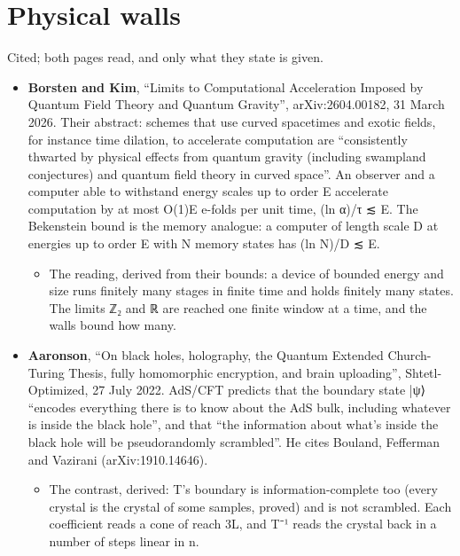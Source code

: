 \section{\texorpdfstring{Physical walls}{Physical walls}}

Cited; both pages read, and only what they state is given.

\begin{itemize}
\item \textbf{Borsten and Kim}, “Limits to Computational Acceleration Imposed by Quantum Field Theory and Quantum Gravity”, arXiv:2604.00182, 31 March 2026. Their abstract: schemes that use curved spacetimes and exotic fields, for instance time dilation, to accelerate computation are “consistently thwarted by physical effects from quantum gravity (including swampland conjectures) and quantum field theory in curved space”. An observer and a computer able to withstand energy scales up to order E accelerate computation by at most O(1)E e-folds per unit time, (ln α)/τ ≲ E. The Bekenstein bound is the memory analogue: a computer of length scale D at energies up to order E with N memory states has (ln N)/D ≲ E.

\begin{itemize}
\item The reading, derived from their bounds: a device of bounded energy and size runs finitely many stages in finite time and holds finitely many states. The limits ℤ₂ and ℝ are reached one finite window at a time, and the walls bound how many.
\end{itemize}
\item \textbf{Aaronson}, “On black holes, holography, the Quantum Extended Church-Turing Thesis, fully homomorphic encryption, and brain uploading”, Shtetl-Optimized, 27 July 2022. AdS/CFT predicts that the boundary state |ψ⟩ “encodes everything there is to know about the AdS bulk, including whatever is inside the black hole”, and that “the information about what's inside the black hole will be pseudorandomly scrambled”. He cites Bouland, Fefferman and Vazirani (arXiv:1910.14646).

\begin{itemize}
\item The contrast, derived: T's boundary is information-complete too (every crystal is the crystal of some samples, proved) and is not scrambled. Each coefficient reads a cone of reach 3L, and T⁻¹ reads the crystal back in a number of steps linear in n.
\end{itemize}
\end{itemize}

